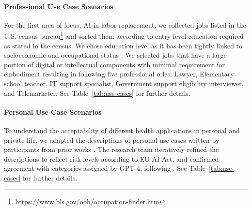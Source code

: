 
\paragraph{Professional Use Case Scenarios} 
For the first area of focus, AI in labor replacement, we collected jobs listed in the U.S. census bureau\footnote{https://www.bls.gov/ooh/occupation-finder.htm} and sorted them according to entry level education required as stated in the census. We chose education level as it has been tightly linked to socioeconomic and occupational status \citep{svensson2006professional,evetts2006introduction}. We selected jobs that have a large portion of digital or intellectual components with minimal requirement for embodiment resulting in following five professional roles: Lawyer, Elementary school teacher, IT support specialist, Government support eligibility interviewer, and Telemarketer. See Table~\ref{tab:use-cases} for further details.

\paragraph{Personal Use Case Scenarios} 
 To understand the acceptability of different health applications in personal and private life, we adapted the descriptions of personal use cases written by participants from prior works \citep{mun2024participaidemocraticsurveyingframework,kieslich2024myfuture}. The research team iteratively refined the descriptions to reflect risk levels according to EU AI Act, and  confirmed agreement with categories assigned by GPT-4, following \citeauthor{herdel2024exploregen}. See Table~\ref{tab:use-cases} for further details.

